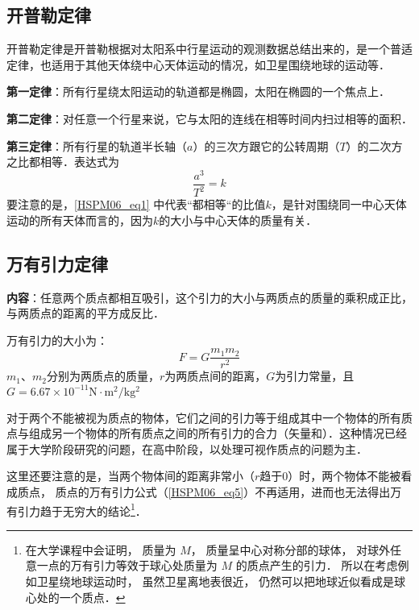 
\begin{issues}
\issueDraft
\issueTODO
\end{issues}


\subsection{开普勒定律}

开普勒定律是开普勒根据对太阳系中行星运动的观测数据总结出来的，是一个普适定律，也适用于其他天体绕中心天体运动的情况，如卫星围绕地球的运动等．

\textbf{第一定律}：所有行星绕太阳运动的轨道都是椭圆，太阳在椭圆的一个焦点上．

\textbf{第二定律}：对任意一个行星来说，它与太阳的连线在相等时间内扫过相等的面积．

\textbf{第三定律}：所有行星的轨道半长轴（$a$）的三次方跟它的公转周期（$T$）的二次方之比都相等．表达式为
\begin{equation}\label{HSPM06_eq1}
\frac{a^3}{T^2}=k
\end{equation}
要注意的是，\autoref{HSPM06_eq1} 中代表“都相等“的比值$k$，是针对围绕同一中心天体运动的所有天体而言的，因为$k$的大小与中心天体的质量有关．

\subsection{万有引力定律}

\textbf{内容}：任意两个质点都相互吸引，这个引力的大小与两质点的质量的乘积成正比，与两质点的距离的平方成反比．

万有引力的大小为：
\begin{equation}\label{HSPM06_eq5}
F=G\frac{m_1m_2}{r^2}
\end{equation}
$m_1$、$m_2$分别为两质点的质量，$r$为两质点间的距离，$G$为引力常量，且$G=6.67\times 10^{-11}\mathrm{N\cdot m^2/kg^2}$

对于两个不能被视为质点的物体，它们之间的引力等于组成其中一个物体的所有质点与组成另一个物体的所有质点之间的所有引力的合力（矢量和）．这种情况已经属于大学阶段研究的问题，在高中阶段，以处理可视作质点的问题为主．

这里还要注意的是，当两个物体间的距离非常小（$r$趋于$0$）时，两个物体不能被看成质点， 质点的万有引力公式（\autoref{HSPM06_eq5}）不再适用，进而也无法得出万有引力趋于无穷大的结论\footnote{在大学课程中会证明， 质量为 $M$， 质量呈中心对称分部的球体， 对球外任意一点的万有引力等效于球心处质量为 $M$ 的质点产生的引力． 所以在考虑例如卫星绕地球运动时， 虽然卫星离地表很近， 仍然可以把地球近似看成是球心处的一个质点．}．


